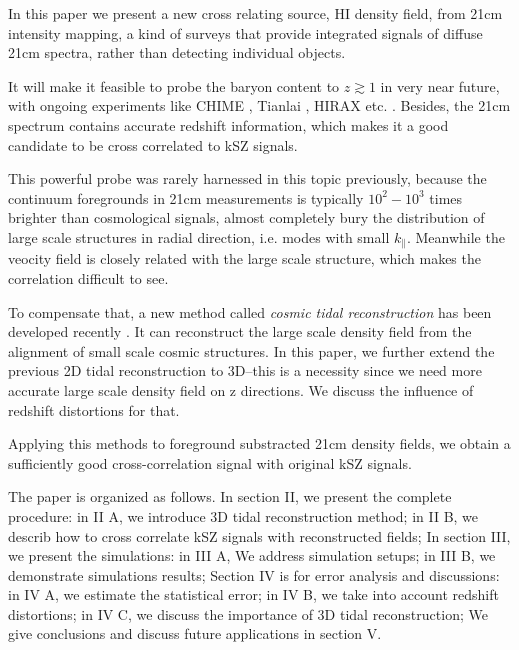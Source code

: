 In this paper we present a new cross relating source, HI density field, from 21cm intensity mapping, 
a kind of surveys that provide integrated signals of diffuse 21cm spectra, 
rather than detecting individual objects. 

It will make it feasible to probe the baryon content to $z\gtrsim1$ in very near future, with ongoing experiments like
CHIME \cite{2014SPIE.9145E..22B}, Tianlai \cite{2015ApJ...798...40X}, 
HIRAX \cite{HIRAX} etc.
.
Besides, the 21cm spectrum contains accurate redshift information, which makes it a good candidate to be cross correlated to kSZ signals.

This powerful probe was rarely harnessed in this topic previously, 
because the continuum foregrounds in 21cm measurements is typically $10^2 - 10^3$ times brighter than cosmological signals, almost completely bury the distribution of large scale structures in radial direction, i.e. modes with small $k_\parallel$.
Meanwhile the veocity field is closely related with the large scale structure, 
which makes the correlation difficult to see.

To compensate that, a new method called {\it cosmic tidal reconstruction} has been 
developed recently \cite{2012:pen}\cite{2015:zhu}. 
It can reconstruct the large scale density field from the alignment of small 
scale cosmic structures. 
In this paper, we further extend the previous 2D tidal reconstruction to 3D--this is a necessity since we need more accurate large scale density field on z directions. We discuss the influence of redshift distortions for that.

Applying this methods to foreground substracted 21cm density fields, we obtain a sufficiently good cross-correlation signal with original kSZ signals. 

The paper is organized as follows. 
In section II, we present the complete procedure: 
in II A, we introduce 3D tidal reconstruction method; 
in II B, we describ how to cross correlate
kSZ signals with reconstructed fields; 
In section III, we present the simulations: 
in III A, We address simulation setups; 
in III B, we demonstrate simulations results;
Section IV is for error analysis and discussions:
in IV A, we estimate the statistical error;
in IV B, we take into account redshift distortions;
in IV C, we discuss the importance of 3D tidal reconstruction;
We give conclusions and discuss future applications in section V.



